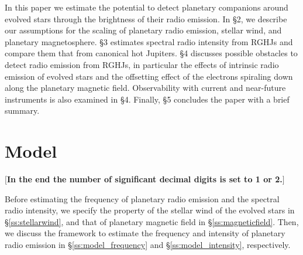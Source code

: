 \documentclass{emulateapj}
\def\memoYF#1{\color{red}$[${\bf #1}$]$ \color{black}}
\begin{document}
In this paper we estimate the potential to detect planetary companions around evolved stars through the brightness of their radio emission. 
In \S2, we describe our assumptions for the scaling of planetary radio emission, stellar wind, and planetary magnetosphere.  
\S3 estimates spectral radio intensity from RGHJs and compare them that from canonical hot Jupiters. 
\S4 discusses possible obstacles to detect radio emission from RGHJs, in particular the effects of intrinsic radio emission of evolved stars and the  offsetting effect of the electrons spiraling down along the planetary magnetic field. Observability with current and near-future instruments is also examined in \S4. 
Finally, \S5 concludes the paper with a brief summary. 






\section{Model}
\label{s:assumptions}

\memoYF{In the end the number of significant decimal digits is set to 1 or 2.}

Before estimating the frequency of planetary radio emission and the spectral radio intensity, we specify the property of the stellar wind of the evolved stars in \S\ref{ss:stellarwind}, and that of planetary magnetic field in \S\ref{ss:magneticfield}.  
Then, we discuss the framework to estimate the frequency and intensity of planetary radio emission in \S\ref{ss:model_frequency} and \S\ref{ss:model_intensity}, respectively. 
\end{document}
